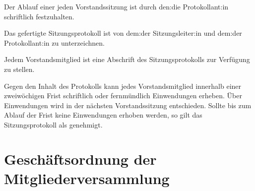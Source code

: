 \begin{gfvorstand}
  Der Ablauf einer jeden Vorstandssitzung ist durch den:die Protokollant:in schriftlich festzuhalten.

  Das gefertigte Sitzungsprotokoll ist von dem:der Sitzungsleiter:in und dem:der Protokollant:in zu unterzeichnen.

  Jedem Vorstandsmitglied ist eine Abschrift des Sitzungsprotokolls zur Verfügung zu stellen.

  Gegen den Inhalt des Protokolls kann jedes Vorstandsmitglied innerhalb einer zweiwöchigen Frist schriftlich oder fernmündlich Einwendungen erheben. Über Einwendungen wird in der nächsten Vorstandssitzung entschieden. Sollte bis zum Ablauf der Frist keine Einwendungen erhoben werden, so gilt das Sitzungsprotokoll als genehmigt.

\end{gfvorstand}

\section{Geschäftsordnung der Mitgliederversammlung}

